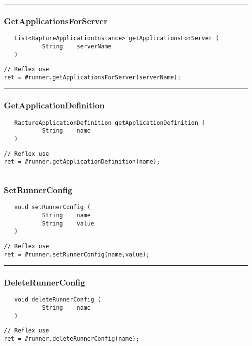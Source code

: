 \rule{15cm}{2pt}
\subsubsection{GetApplicationsForServer}
\label{Api:GetApplicationsForServer}
\begin{verbatim}
   List<RaptureApplicationInstance> getApplicationsForServer (
           String    serverName
   )
\end{verbatim}
\begin{lstlisting}[language=reflex]
// Reflex use
ret = #runner.getApplicationsForServer(serverName);
\end{lstlisting}



\rule{15cm}{2pt}
\subsubsection{GetApplicationDefinition}
\label{Api:GetApplicationDefinition}
\begin{verbatim}
   RaptureApplicationDefinition getApplicationDefinition (
           String    name
   )
\end{verbatim}
\begin{lstlisting}[language=reflex]
// Reflex use
ret = #runner.getApplicationDefinition(name);
\end{lstlisting}



\rule{15cm}{2pt}
\subsubsection{SetRunnerConfig}
\label{Api:SetRunnerConfig}
\begin{verbatim}
   void setRunnerConfig (
           String    name
           String    value
   )
\end{verbatim}
\begin{lstlisting}[language=reflex]
// Reflex use
ret = #runner.setRunnerConfig(name,value);
\end{lstlisting}



\rule{15cm}{2pt}
\subsubsection{DeleteRunnerConfig}
\label{Api:DeleteRunnerConfig}
\begin{verbatim}
   void deleteRunnerConfig (
           String    name
   )
\end{verbatim}
\begin{lstlisting}[language=reflex]
// Reflex use
ret = #runner.deleteRunnerConfig(name);
\end{lstlisting}



